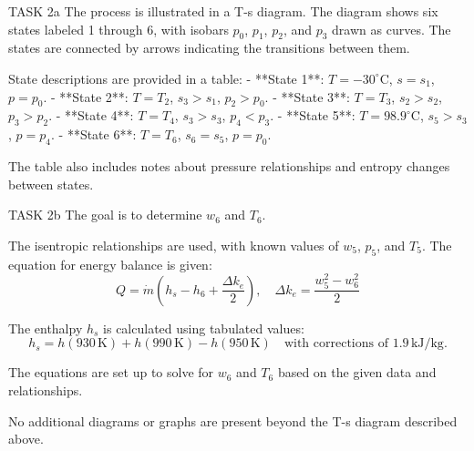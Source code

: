 TASK 2a  
The process is illustrated in a T-s diagram. The diagram shows six states labeled 1 through 6, with isobars \( p_0 \), \( p_1 \), \( p_2 \), and \( p_3 \) drawn as curves. The states are connected by arrows indicating the transitions between them.  

State descriptions are provided in a table:  
- **State 1**: \( T = -30^\circ\text{C} \), \( s = s_1 \), \( p = p_0 \).  
- **State 2**: \( T = T_2 \), \( s_3 > s_1 \), \( p_2 > p_0 \).  
- **State 3**: \( T = T_3 \), \( s_2 > s_2 \), \( p_3 > p_2 \).  
- **State 4**: \( T = T_4 \), \( s_3 > s_3 \), \( p_4 < p_3 \).  
- **State 5**: \( T = 98.9^\circ\text{C} \), \( s_5 > s_3 \), \( p = p_4 \).  
- **State 6**: \( T = T_6 \), \( s_6 = s_5 \), \( p = p_0 \).  

The table also includes notes about pressure relationships and entropy changes between states.  

TASK 2b  
The goal is to determine \( w_6 \) and \( T_6 \).  

The isentropic relationships are used, with known values of \( w_5 \), \( p_5 \), and \( T_5 \). The equation for energy balance is given:  
\[
Q = \dot{m} \left( h_s - h_6 + \frac{\Delta k_e}{2} \right), \quad \Delta k_e = \frac{w_5^2 - w_6^2}{2}
\]  

The enthalpy \( h_s \) is calculated using tabulated values:  
\[
h_s = h(930 \, \text{K}) + h(990 \, \text{K}) - h(950 \, \text{K}) \quad \text{with corrections of } 1.9 \, \text{kJ/kg}.
\]  

The equations are set up to solve for \( w_6 \) and \( T_6 \) based on the given data and relationships.  

No additional diagrams or graphs are present beyond the T-s diagram described above.